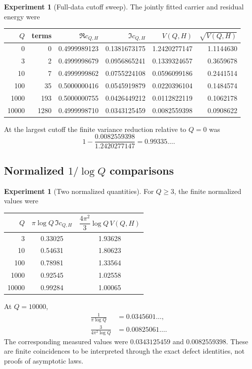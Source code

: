 \documentclass[11pt]{amsart}
\numberwithin{equation}{section}
\theoremstyle{plain}
\theoremstyle{definition}
\newtheorem{experiment}[theorem]{Experiment}
\theoremstyle{remark}
\newcommand{\1}{\mathbf{1}}
\begin{document}
\begin{experiment}[Full-data cutoff sweep]
\label{exp:full_data_sweep}
The jointly fitted carrier and residual energy were
\begin{center}
\begin{tabular}{rrrrrr}
\toprule
$Q$ & terms & $\Re c_{Q,H}$ & $\Im c_{Q,H}$ & $V(Q,H)$ & $\sqrt{V(Q,H)}$\\
\midrule
0 & 0 & 0.4999989123 & 0.1381673175 & 1.2420277147 & 1.1144630\\
3 & 2 & 0.4999998679 & 0.0956865241 & 0.1339324657 & 0.3659678\\
10 & 7 & 0.4999999862 & 0.0755224108 & 0.0596099186 & 0.2441514\\
100 & 35 & 0.5000000416 & 0.0545919879 & 0.0220396104 & 0.1484574\\
1000 & 193 & 0.5000000755 & 0.0426449212 & 0.0112822119 & 0.1062178\\
10000 & 1280 & 0.4999998710 & 0.0343125459 & 0.0082559398 & 0.0908622\\
\bottomrule
\end{tabular}
\end{center}
At the largest cutoff the finite variance reduction relative to $Q=0$ was
\begin{equation}
1-\frac{0.0082559398}{1.2420277147}
=0.99335\ldots.
\label{eq:numerical_variance_reduction_detailed}
\end{equation}
\end{experiment}

\subsection{Normalized \texorpdfstring{\(1/\log Q\)}{1/log Q} comparisons}
\label{subsec:numerical_normalized_scaling}

\begin{experiment}[Two normalized quantities]
\label{exp:numerical_normalized_quantities}
For $Q\geq3$, the finite normalized values were
\begin{center}
\begin{tabular}{rcc}
\toprule
$Q$ & $\pi\log Q\,\Im c_{Q,H}$ &
$\dfrac{4\pi^2}{3}\log Q\,V(Q,H)$\\
\midrule
3 & 0.33025 & 1.93628\\
10 & 0.54631 & 1.80623\\
100 & 0.78981 & 1.33564\\
1000 & 0.92545 & 1.02558\\
10000 & 0.99284 & 1.00065\\
\bottomrule
\end{tabular}
\end{center}
At $Q=10000$,
\begin{align}
\frac1{\pi\log Q}
&=0.0345601\ldots,
\label{eq:numerical_imag_prediction}
\\
\frac3{4\pi^2\log Q}
&=0.00825061\ldots.
\label{eq:numerical_variance_prediction}
\end{align}
The corresponding measured values were
$0.0343125459$ and $0.0082559398$.  These are finite coincidences to be
interpreted through the exact defect identities, not proofs of asymptotic
laws.
\end{experiment}
\end{document}
